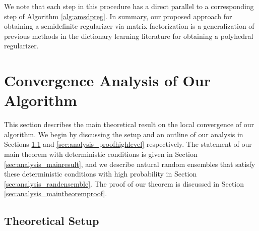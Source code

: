 \documentclass[11pt,letterpaper]{article}
\begin{document}
We note that each step in this procedure has a direct parallel to a corresponding step of Algorithm \ref{alg:amsdpreg}.  In summary, our proposed approach for obtaining a semidefinite regularizer via matrix factorization is a generalization of previous methods in the dictionary learning literature for obtaining a polyhedral regularizer.




\section{Convergence Analysis of Our Algorithm} \label{sec:analysis}

%
%

This section describes the main theoretical result on the local convergence of our algorithm.  We begin by discussing the setup and an outline of our analysis in Sections \ref{sec:analysis_setup} and \ref{sec:analysis_proofhighlevel} respectively.  The statement of our main theorem with deterministic conditions is given in Section \ref{sec:analysis_mainresult}, and we describe natural random ensembles that satisfy these deterministic conditions with high probability in Section \ref{sec:analysis_randensemble}.  The proof of our theorem is discussed in Section \ref{sec:analysis_maintheoremproof}.

\subsection{Theoretical Setup} \label{sec:analysis_setup}

\end{document}
